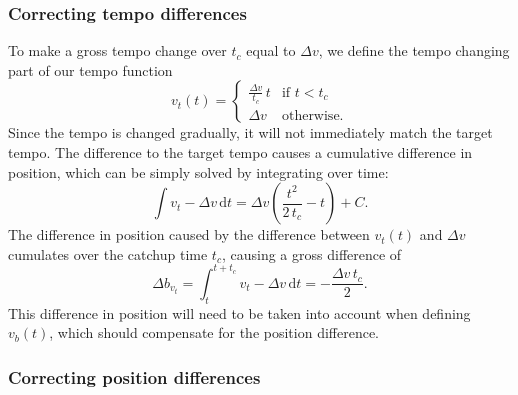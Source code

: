 \subsubsection*{Correcting tempo differences}

To make a gross tempo change
over $t_c$ equal to $\Delta v$,
we define the tempo changing part of our tempo function
\begin{equation}
\label{eq:tempo_function_tempo_correction}
v_t(t) =
\begin{cases}
\frac{\Delta v}{t_c} \, t & \text{if } t < t_c \\
\Delta v & \text{otherwise}.
\end{cases}
\end{equation}
Since the tempo is changed gradually,
it will not immediately match the target tempo.
The difference to the target tempo causes
a cumulative difference in position,
which can be simply solved by integrating over time:
\begin{equation}
\label{eq:linear_tempo_change_pos_diff}
\int v_t - \Delta v \, \mathrm{d}t =
\Delta v \left( \frac{t^2}{2 \, t_c} - t \right) + C.
\end{equation}
The difference in position
caused by the difference between $v_t(t)$ and $\Delta v$
cumulates over the catchup time $t_c$,
causing a gross difference of
\begin{equation}
\Delta b_{v_t} =
\int_t^{t + t_c} v_t - \Delta v \, \mathrm{d}t =
-\frac{\Delta v \, t_c }{2}.
\end{equation}
This difference in position will need to be taken into account
when defining $v_b(t)$,
which should compensate for the position difference.

\subsubsection*{Correcting position differences}

